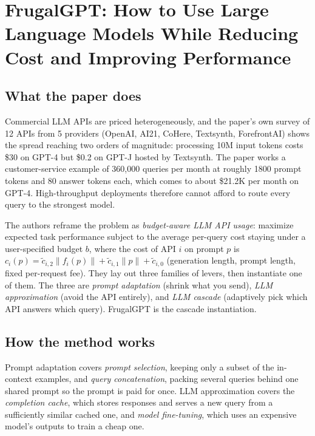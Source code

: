 \section{FrugalGPT: How to Use Large Language Models While Reducing Cost and Improving Performance}

\subsection{What the paper does}

Commercial LLM APIs are priced heterogeneously, and the paper's own survey of 12 APIs from 5 providers (OpenAI, AI21, CoHere, Textsynth, ForefrontAI) shows the spread reaching two orders of magnitude: processing 10M input tokens costs \$30 on GPT-4 but \$0.2 on GPT-J hosted by Textsynth. The paper works a customer-service example of 360{,}000 queries per month at roughly 1800 prompt tokens and 80 answer tokens each, which comes to about \$21.2K per month on GPT-4. High-throughput deployments therefore cannot afford to route every query to the strongest model.

The authors reframe the problem as \emph{budget-aware LLM API usage}: maximize expected task performance subject to the average per-query cost staying under a user-specified budget $b$, where the cost of API $i$ on prompt $p$ is $c_i(p)=\tilde{c}_{i,2}\|f_i(p)\|+\tilde{c}_{i,1}\|p\|+\tilde{c}_{i,0}$ (generation length, prompt length, fixed per-request fee). They lay out three families of levers, then instantiate one of them. The three are \emph{prompt adaptation} (shrink what you send), \emph{LLM approximation} (avoid the API entirely), and \emph{LLM cascade} (adaptively pick which API answers which query). FrugalGPT is the cascade instantiation.

\subsection{How the method works}

Prompt adaptation covers \emph{prompt selection}, keeping only a subset of the in-context examples, and \emph{query concatenation}, packing several queries behind one shared prompt so the prompt is paid for once. LLM approximation covers the \emph{completion cache}, which stores responses and serves a new query from a sufficiently similar cached one, and \emph{model fine-tuning}, which uses an expensive model's outputs to train a cheap one.

